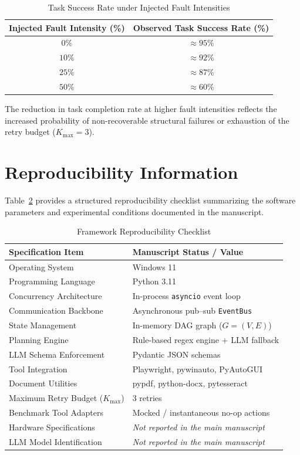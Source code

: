\documentclass[conference]{IEEEtran}
\begin{document}
\begin{table}[htbp]
\caption{Task Success Rate under Injected Fault Intensities}
\label{tab:fault_injection}
\centering
\begin{tabular}{c c}
\toprule
\textbf{Injected Fault Intensity (\%)} & \textbf{Observed Task Success Rate (\%)} \\
\midrule
$0\%$ & $\approx 95\%$ \\
$10\%$ & $\approx 92\%$ \\
$25\%$ & $\approx 87\%$ \\
$50\%$ & $\approx 60\%$ \\
\bottomrule
\end{tabular}
\end{table}

The reduction in task completion rate at higher fault intensities reflects the increased probability of non-recoverable structural failures or exhaustion of the retry budget ($K_{\text{max}} = 3$).

\section{Reproducibility Information}
\label{sec:reproducibility}
Table~\ref{tab:reproducibility_checklist} provides a structured reproducibility checklist summarizing the software parameters and experimental conditions documented in the manuscript.

\begin{table}[htbp]
\caption{Framework Reproducibility Checklist}
\label{tab:reproducibility_checklist}
\centering
\begin{tabular}{p{3.0cm} p{4.8cm}}
\toprule
\textbf{Specification Item} & \textbf{Manuscript Status / Value} \\
\midrule
Operating System & Windows 11 \\
Programming Language & Python 3.11 \\
Concurrency Architecture & In-process \texttt{asyncio} event loop \\
Communication Backbone & Asynchronous pub--sub \texttt{EventBus} \\
State Management & In-memory DAG graph ($G=(V,E)$) \\
Planning Engine & Rule-based regex engine + LLM fallback \\
LLM Schema Enforcement & Pydantic JSON schemas \\
Tool Integration & Playwright, pywinauto, PyAutoGUI \\
Document Utilities & pypdf, python-docx, pytesseract \\
Maximum Retry Budget ($K_{\text{max}}$) & 3 retries \\
Benchmark Tool Adapters & Mocked / instantaneous no-op actions \\
Hardware Specifications & \textit{Not reported in the main manuscript} \\
LLM Model Identification & \textit{Not reported in the main manuscript} \\
\bottomrule
\end{tabular}
\end{table}
\end{document}
